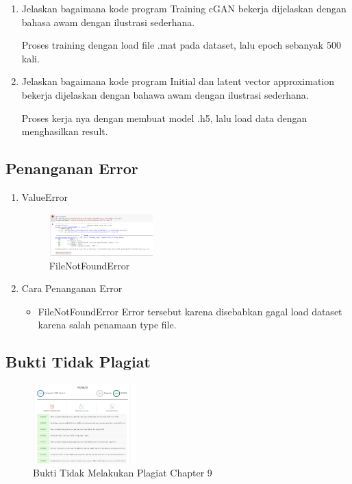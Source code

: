 \begin{enumerate}
	\item Jelaskan bagaimana kode program Training cGAN bekerja dijelaskan dengan bahasa awam dengan ilustrasi sederhana.
	\hfill\break
	
	Proses training dengan load file .mat pada dataset, lalu epoch sebanyak 500 kali.

	\item Jelaskan bagaimana kode program Initial dan latent vector approximation bekerja dijelaskan dengan bahawa awam dengan ilustrasi sederhana.
	\hfill\break
	
	Proses kerja nya dengan membuat model .h5, lalu load data dengan menghasilkan result.
\end{enumerate}
\subsection{Penanganan Error}
\begin{enumerate}
	\item ValueError
	\begin{figure}[H]
		\centering
		\includegraphics[width=4cm]{figures/1174027/error/9_file_not_found.png}
		\caption{FileNotFoundError}
	\end{figure}

	\item Cara Penanganan Error
	\begin{itemize}
		\item FileNotFoundError
		\hfill\break
		Error tersebut karena disebabkan gagal load dataset karena salah penamaan type file.
	\end{itemize}
\end{enumerate}
\subsection{Bukti Tidak Plagiat}
\begin{figure}[H]
	\includegraphics[width=4cm]{figures/1174027/bukti/9.png}
	\centering
	\caption{Bukti Tidak Melakukan Plagiat Chapter 9}
\end{figure}